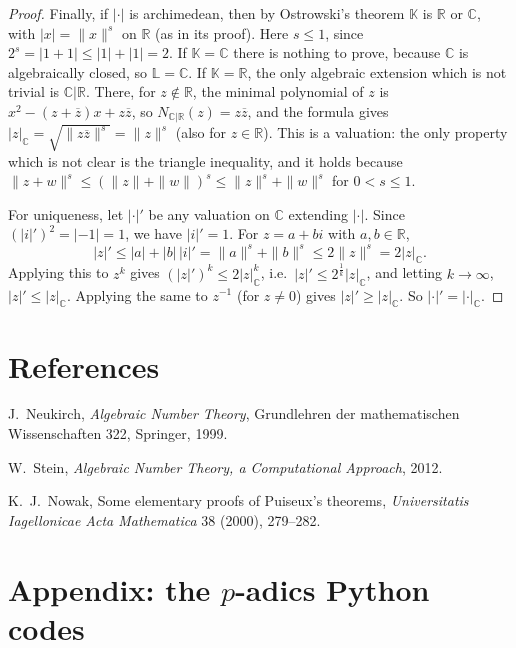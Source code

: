 \documentclass[11pt]{article}
\begin{document}
\begin{proof}
Finally, if $|\cdot|$ is archimedean, then by Ostrowski's theorem $\mathbb{K}$ is $\mathbb{R}$ or $\mathbb{C}$, with $|x| = \|x\|^s$ on $\mathbb{R}$ (as in its proof). Here $s \leq 1$, since $2^s = |1 + 1| \leq |1| + |1| = 2$. If $\mathbb{K} = \mathbb{C}$ there is nothing to prove, because $\mathbb{C}$ is algebraically closed, so $\mathbb{L} = \mathbb{C}$. If $\mathbb{K} = \mathbb{R}$, the only algebraic extension which is not trivial is $\mathbb{C}|\mathbb{R}$. There, for $z \notin \mathbb{R}$, the minimal polynomial of $z$ is $x^2 - (z + \overline{z})x + z\overline{z}$, so $N_{\mathbb{C}|\mathbb{R}}(z) = z\overline{z}$, and the formula gives $|z|_{\mathbb{C}} = \sqrt{\|z\overline{z}\|^s} = \|z\|^s$ (also for $z \in \mathbb{R}$). This is a valuation: the only property which is not clear is the triangle inequality, and it holds because $\|z + w\|^s \leq (\|z\| + \|w\|)^s \leq \|z\|^s + \|w\|^s$ for $0 < s \leq 1$.

For uniqueness, let $|\cdot|'$ be any valuation on $\mathbb{C}$ extending $|\cdot|$. Since $(|i|')^2 = |{-1}| = 1$, we have $|i|' = 1$. For $z = a + bi$ with $a, b \in \mathbb{R}$,
\[
|z|' \leq |a| + |b|\,|i|' = \|a\|^s + \|b\|^s \leq 2\|z\|^s = 2|z|_{\mathbb{C}} .
\]
Applying this to $z^k$ gives $(|z|')^k \leq 2|z|_{\mathbb{C}}^k$, i.e.\ $|z|' \leq 2^{\frac1k}|z|_{\mathbb{C}}$, and letting $k \rightarrow \infty$, $|z|' \leq |z|_{\mathbb{C}}$. Applying the same to $z^{-1}$ (for $z \neq 0$) gives $|z|' \geq |z|_{\mathbb{C}}$. So $|\cdot|' = |\cdot|_{\mathbb{C}}$.
\end{proof}

\section*{References}

\begin{enumerate}[label={[\arabic*]}, leftmargin=*]
\item J.~Neukirch, \textit{Algebraic Number Theory}, Grundlehren der mathematischen Wissenschaften 322, Springer, 1999.
\item W.~Stein, \textit{Algebraic Number Theory, a Computational Approach}, 2012.
\item K.~J.~Nowak, Some elementary proofs of Puiseux's theorems, \textit{Universitatis Iagellonicae Acta Mathematica} 38 (2000), 279--282.
\end{enumerate}

\section*{Appendix: the $p$-adics Python codes}
\end{document}
